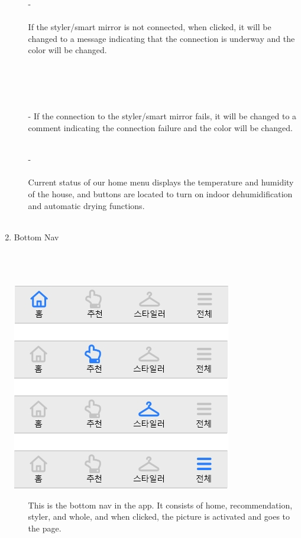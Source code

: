 \documentclass[conference]{IEEEtran}
\begin{document}
\begin{enumerate}
\begin{enumerate}
 \break
 \item[-] \\ \\ If the styler/smart mirror is not connected, when clicked, it will be changed to a message indicating that the connection is underway and the color will be changed.\\ \\ \\ \\ \\
 \item[-] If the connection to the styler/smart mirror fails, it will be changed to a comment indicating the connection failure and the color will be changed. \\ \\
 \item[-] \\ \\ Current status of our home menu displays the temperature and humidity of the house, and buttons are located to turn on indoor dehumidification and automatic drying functions.\\ \\
 \end{enumerate}
 \item Bottom Nav \\ \\ \\ \\
 \centerline{\includegraphics[scale=0.5]{assets/하단 nav.jpg}}
 \break
 \begin{itemize}
    \item[] This is the bottom nav in the app. It consists of home, recommendation, styler, and whole, and when clicked, the picture is activated and goes to the page.
\end{itemize}
\end{enumerate}
\end{document}
